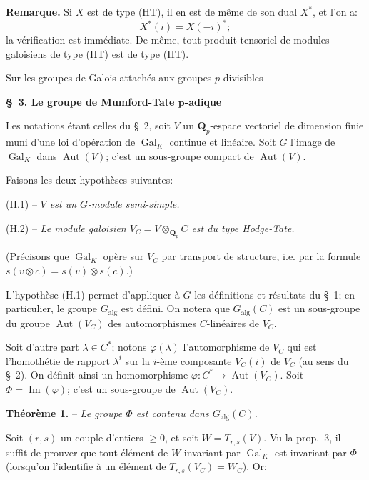 \textbf{Remarque.} Si $X$ est de type (HT), il en est de même de son dual $X^*$, et l’on a:
\[
X^*(i)=X(-i)^*;
\]
la vérification est immédiate. De même, tout produit tensoriel de modules galoisiens de type (HT) est de type (HT).
\begin{center}\small Sur les groupes de Galois attachés aux groupes $p$-divisibles\end{center}
\begin{center}\textbf{\S~3. Le groupe de Mumford-Tate $\boldsymbol{p}$-adique}\end{center}

Les notations étant celles du \S~2, soit $V$ un $\mathbf{Q}_p$-espace vectoriel de dimension finie muni d’une loi d’opération de $\operatorname{Gal}_K$ continue et linéaire. Soit $G$ l’image de $\operatorname{Gal}_K$ dans $\operatorname{Aut}(V)$; c’est un sous-groupe compact de $\operatorname{Aut}(V)$.

Faisons les deux hypothèses suivantes:

(H.1) -- \textit{$V$ est un $G$-module semi-simple.}

(H.2) -- \textit{Le module galoisien $V_C=V\otimes_{\mathbf{Q}_p}C$ est du type Hodge-Tate.}

(Précisons que $\operatorname{Gal}_K$ opère sur $V_C$ par transport de structure, i.e. par la formule $s(v\otimes c)=s(v)\otimes s(c)$.)

L’hypothèse (H.1) permet d’appliquer à $G$ les définitions et résultats du \S~1; en particulier, le groupe $G_{\mathrm{alg}}$ est défini. On notera que $G_{\mathrm{alg}}(C)$ est un sous-groupe du groupe $\operatorname{Aut}(V_C)$ des automorphismes $C$-linéaires de $V_C$.

Soit d’autre part $\lambda\in C^*$; notons $\varphi(\lambda)$ l’automorphisme de $V_C$ qui est l’homothétie de rapport $\lambda^i$ sur la $i$-ème composante $V_C(i)$ de $V_C$ (au sens du \S~2). On définit ainsi un homomorphisme $\varphi:C^*\to\operatorname{Aut}(V_C)$. Soit $\varPhi=\operatorname{Im}(\varphi)$; c’est un sous-groupe de $\operatorname{Aut}(V_C)$.

\textbf{Théorème 1.} -- \textit{Le groupe $\varPhi$ est contenu dans $G_{\mathrm{alg}}(C)$.}

Soit $(r,s)$ un couple d’entiers $\geqslant 0$, et soit $W=T_{r,s}(V)$. Vu la prop.~3, il suffit de prouver que tout élément de $W$ invariant par $\operatorname{Gal}_K$ est invariant par $\varPhi$ (lorsqu’on l’identifie à un élément de $T_{r,s}(V_C)=W_C$). Or:

